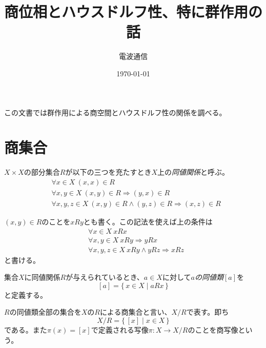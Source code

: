 \documentclass[leqno]{jsarticle}
\title{商位相とハウスドルフ性、特に群作用の話}
\author{電波通信}
\date{\today}
\newcommand{\To}{\Longrightarrow}
\begin{document}
\maketitle
この文書では群作用による商空間とハウスドルフ性の関係を調べる。

\section{商集合}
$X\times X$の部分集合$R$が以下の三つを充たすとき$X$上の\emph{同値関係}と呼ぶ。
\begin{align}
&\forall x\in X\  (x,x)\in R\\
&\forall x,y\in X\ (x,y)\in R\To (y,x)\in R\\
&\forall x,y,z\in X\ (x,y)\in R\land (y,z)\in R\To (x,z)\in R
\end{align}

$(x,y)\in R$のことを$xRy$とも書く。この記法を使えば上の条件は
\setcounter{equation}{0}
\begin{align}
&\forall x\in X\  xRx\\
&\forall x,y\in X\ xRy\To yRx\\
&\forall x,y,z\in X\ xRy\land yRz\To xRz
\end{align}
と書ける。

集合$X$に同値関係$R$が与えられているとき、$a\in X$に対して\emph{$a$の同値類$[a]$}を
\[
[a]=\{\,x\in X\mid aRx\,\}
\]
と定義する。

$R$の同値類全部の集合を$X$の$R$による商集合と言い、$X/R$で表す。即ち
\[
X/R=\{\,[x]\mid x\in X\,\}
\]
である。また$\pi(x)=[x]$で定義される写像$\pi:X\to X/R$のことを商写像という。
\end{document}
